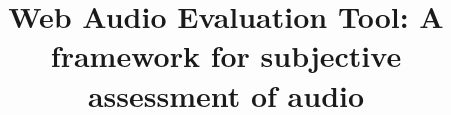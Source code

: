 \documentclass{sig-alternate}
\begin{document}

\newcommand*\rot{\rotatebox{90}}


%
%
%

%

\title{Web Audio Evaluation Tool: A framework for subjective assessment of audio}
%
%
%
%
%
\end{document}
